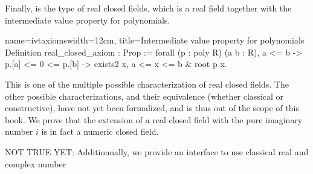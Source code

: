 Finally,  is the type of real closed fields, which is a
real field together with the intermediate value property for
polynomials.
\begin{coq}{name=ivtaxioms}{width=12cm, title=Intermediate value
    property for polynomials}
Definition real_closed_axiom : Prop :=
  forall (p : {poly R}) (a b : R),
    a <= b -> p.[a] <= 0 <= p.[b] -> exists2 x, a <= x <= b & root p x.
\end{coq}
This is one of the multiple possible characterization of real closed
fields. The other possible characterizations, and their equivalence
(whether classical or constructive), have not yet been formalized, and
is thus out of the scope of this book.  We prove that the extension of
a real closed field with the pure imaginary number $i$ is in fact a
numeric closed field.


NOT TRUE YET: Additionnally, we provide an interface to use classical real and
complex number

